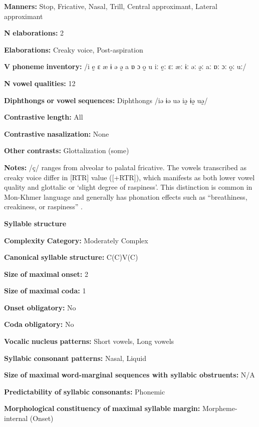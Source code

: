 \textbf{Manners:} Stop, Fricative, Nasal, Trill, Central approximant, Lateral approximant

\textbf{N} \textbf{elaborations:} 2

\textbf{Elaborations:} Creaky voice, Post-aspiration

\textbf{V} \textbf{phoneme} \textbf{inventory:} /i ḛ ɛ æ ɨ ə ə̰ a ɒ ɔ o̰ u iː ḛː ɛː æː ɨː əː ə̰ː aː ɒː ɔː o̰ː uː/

\textbf{N} \textbf{vowel} \textbf{qualities:} 12

\textbf{Diphthongs} \textbf{or} \textbf{vowel} \textbf{sequences:} Diphthongs /iə ɨə uə iə̰ ɨə̰ uə̰/

\textbf{Contrastive} \textbf{length:} All

\textbf{Contrastive} \textbf{nasalization:} None

\textbf{Other} \textbf{contrasts:} Glottalization (some)

\textbf{Notes:} /ç/ ranges from alveolar to palatal fricative. The vowels transcribed as creaky voice differ in [RTR] value ([+RTR]), which manifests as both lower vowel quality and glottalic or ‘slight degree of raspiness’. This distinction is common in Mon-Khmer language and generally has phonation effects such as “breathiness, creakiness, or raspiness” \citep[14]{Alves2006}.

\textbf{Syllable} \textbf{structure}

\textbf{Complexity} \textbf{Category:} Moderately Complex

\textbf{Canonical} \textbf{syllable} \textbf{structure:} C(C)V(C) \citep[17-21]{Alves2006}

\textbf{Size} \textbf{of} \textbf{maximal} \textbf{onset:} 2

\textbf{Size} \textbf{of} \textbf{maximal} \textbf{coda:} 1

\textbf{Onset} \textbf{obligatory:} No

\textbf{Coda} \textbf{obligatory:} No

\textbf{Vocalic} \textbf{nucleus} \textbf{patterns:} Short vowels, Long vowels

\textbf{Syllabic} \textbf{consonant} \textbf{patterns:} Nasal, Liquid

\textbf{Size} \textbf{of} \textbf{maximal} \textbf{word{}-marginal sequences with syllabic obstruents:} N/A

\textbf{Predictability} \textbf{of} \textbf{syllabic} \textbf{consonants:} Phonemic

\textbf{Morphological} \textbf{constituency} \textbf{of} \textbf{maximal} \textbf{syllable} \textbf{margin:} Morpheme-internal (Onset)

